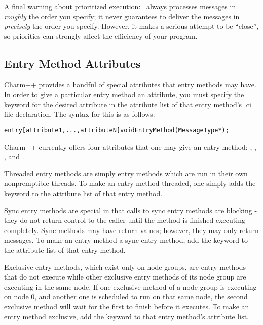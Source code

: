 A final warning about prioritized execution: \charmpp\ always processes
messages in {\it roughly} the order you specify; it never guarantees to
deliver the messages in {\it precisely} the order you specify.
However, it makes a serious attempt to be ``close'', so priorities
can strongly affect the efficiency of your program.

\subsection{Entry Method Attributes}
\label{attributes}

Charm++ provides a handful of special attributes that entry
methods may have.  In order to give a particular entry
method an attribute, you must specify the keyword for the desired attribute in
the attribute list of that entry method's .ci file declaration.  The syntax for
this is as follows:

\begin{alltt}
entry [attribute1, ..., attributeN] void EntryMethod(MessageType *);
\end{alltt}

Charm++ currently offers four attributes that one may give an entry method:
, , , and .

Threaded entry methods are simply entry
methods which are run in their own nonpremptible threads.  To make an
entry method threaded, one simply adds the keyword
 to the attribute list of that entry method.

Sync entry methods are special in that calls to
sync entry methods are blocking - they do not return control to the caller
until the method is finished executing completely.  Sync methods may have
return values; however, they may only return messages.  To make an entry method a sync entry method, add the keyword  to the
attribute list of that entry method.

Exclusive entry methods, which exist only on node groups, are
entry methods that do not execute while other exclusive
entry methods of its node group are executing in the same
node.  If one exclusive method of a node group is executing on node 0, and
another one is scheduled to run on that same node, the second exclusive method
will wait for the first to finish before it executes.  To make an entry method exclusive, add the keyword  to that
entry method's attribute list.

